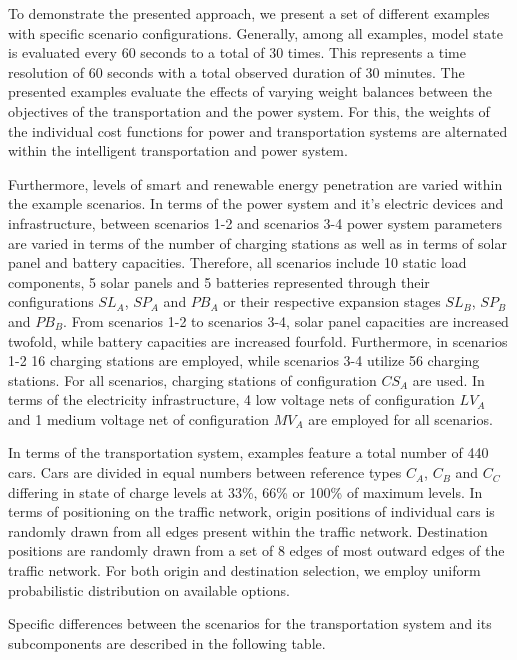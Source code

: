 To demonstrate the presented approach, we present a set of different examples with specific scenario configurations. Generally, among all examples, model state is evaluated every 60 seconds to a total of 30 times. This represents a time resolution of 60 seconds with a total observed duration of 30 minutes. The presented examples evaluate the effects of varying weight balances between the objectives of the transportation and the power system. For this, the weights of the individual cost functions for power and transportation systems are alternated within the intelligent transportation and power system.

Furthermore, levels of smart and renewable energy penetration are varied within the example scenarios. In terms of the power system and it's electric devices and infrastructure, between scenarios 1-2 and scenarios 3-4 power system parameters are varied in terms of the number of charging stations as well as in terms of solar panel and battery capacities. Therefore, all scenarios include 10 static load components, 5 solar panels and 5 batteries represented through their configurations $SL_{A}$, $SP_{A}$ and $PB_{A}$ or their respective expansion stages $SL_{B}$, $SP_{B}$ and $PB_{B}$. From scenarios 1-2 to scenarios 3-4, solar panel capacities are increased twofold, while battery capacities are increased fourfold. Furthermore, in scenarios 1-2 16 charging stations are employed, while scenarios 3-4 utilize 56 charging stations. For all scenarios, charging stations of configuration $CS_{A}$ are used. In terms of the electricity infrastructure, 4 low voltage nets of configuration $LV_{A}$ and 1 medium voltage net of configuration $MV_{A}$ are employed for all scenarios. 


In terms of the transportation system, examples feature a total number of 440 cars. Cars are divided in equal numbers between reference types $C_{A}$, $C_{B}$ and $C_{C}$ differing in state of charge levels at 33\%, 66\% or 100\% of maximum levels. In terms of positioning on the traffic network, origin positions of individual cars is randomly drawn from all edges present within the traffic network. Destination positions are randomly drawn from a set of 8 edges of most outward edges of the traffic network. For both origin and destination selection, we employ uniform probabilistic distribution on available options. 

Specific differences between the scenarios for the transportation system and its subcomponents are described in the following table. 

